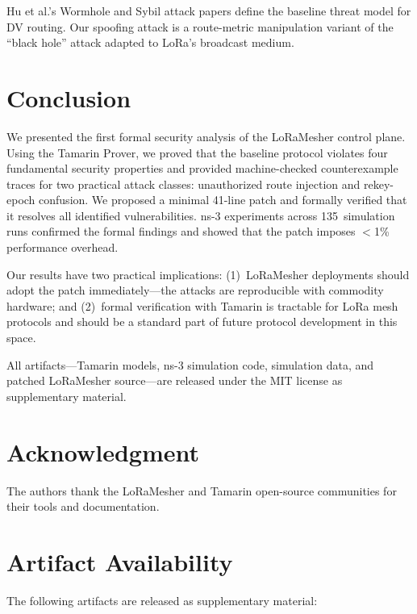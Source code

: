 \documentclass[journal]{IEEEtran}
\begin{document}
Hu et al.'s Wormhole and Sybil attack papers define the baseline
threat model for DV routing. Our spoofing attack is a route-metric
manipulation variant of the ``black hole'' attack adapted to LoRa's
broadcast medium.

\section{Conclusion}
\label{sec:conclusion}

We presented the first formal security analysis of the LoRaMesher
control plane. Using the Tamarin Prover, we proved that the baseline
protocol violates four fundamental security properties and provided
machine-checked counterexample traces for two practical attack classes:
unauthorized route injection and rekey-epoch confusion. We proposed
a minimal 41-line patch and formally verified that it resolves all
identified vulnerabilities. ns-3 experiments across 135~simulation
runs confirmed the formal findings and showed that the patch imposes
$<$1\% performance overhead.

Our results have two practical implications: (1)~LoRaMesher
deployments should adopt the patch immediately—the attacks are
reproducible with commodity hardware; and (2)~formal verification
with Tamarin is tractable for LoRa mesh protocols and should be
a standard part of future protocol development in this space.

All artifacts—Tamarin models, ns-3 simulation code, simulation data,
and patched LoRaMesher source—are released under the MIT license
as supplementary material.

\section*{Acknowledgment}
The authors thank the LoRaMesher and Tamarin open-source communities
for their tools and documentation.

\appendix
\section{Artifact Availability}
\label{app:artifact}

The following artifacts are released as supplementary material:
\end{document}
